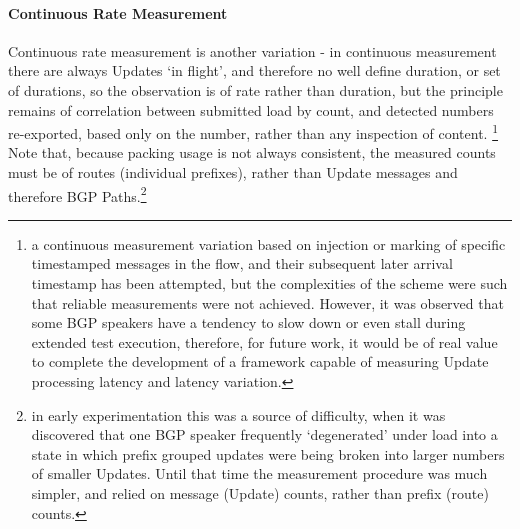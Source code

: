 \paragraph{Continuous Rate Measurement}
Continuous rate measurement is another variation - in continuous measurement there are always Updates `in flight', and therefore no well define duration, or set of durations, so the observation is of rate rather than duration, but the principle remains of correlation between submitted load by count, and detected numbers re-exported, based only on the number, rather than any inspection of content.
\footnote{a continuous measurement variation based on injection or marking of specific timestamped messages in the flow, and their subsequent later arrival timestamp has been attempted, but the complexities of the scheme were such that reliable measurements were not achieved.
However, it was observed that some BGP speakers have a tendency to slow down or even stall during extended test execution, therefore, for future work, it would be of real value to complete the development of a framework capable of measuring Update processing latency and latency variation.}
Note that, because packing usage is not always consistent, the measured counts must be of routes (individual prefixes), rather than Update messages and therefore BGP Paths.\footnote{in early experimentation this was a source of difficulty, when it was discovered that one BGP speaker frequently `degenerated' under load into a state in which prefix grouped 
updates were being broken into larger numbers of smaller Updates.
Until that time the measurement  procedure was much simpler, and relied on message (Update) counts, rather than prefix (route) counts.}

